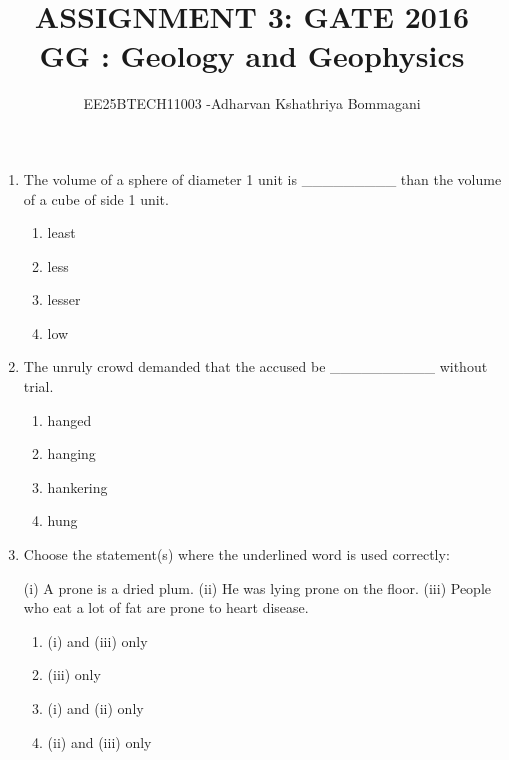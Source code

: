 \documentclass[journal,12pt,onecolumn]{IEEEtran}
\begin{document}
\title{
ASSIGNMENT 3: GATE 2016\\
GG : Geology and Geophysics}
\author{EE25BTECH11003 -Adharvan Kshathriya Bommagani}
\maketitle

\begin{enumerate}

\item The volume of a sphere of diameter 1 unit is \_\_\_\_\_\_\_\_\_ than the volume of a cube of side 1 unit.  

\hfill{}  

\begin{multicols}{4}
\begin{enumerate}
\item least
\item less
\item lesser
\item low
\end{enumerate}
\end{multicols}

\item The unruly crowd demanded that the accused be \_\_\_\_\_\_\_\_\_\_ without trial.  

\hfill{}  

\begin{multicols}{4}
\begin{enumerate}
\item hanged
\item hanging
\item hankering
\item hung
\end{enumerate}
\end{multicols}

\item Choose the statement(s) where the underlined word is used correctly:  

(i) A prone is a dried plum.  
(ii) He was lying prone on the floor.  
(iii) People who eat a lot of fat are prone to heart disease.  

\hfill{}  

\begin{multicols}{2}
\begin{enumerate}
\item (i) and (iii) only
\item (iii) only
\item (i) and (ii) only
\item (ii) and (iii) only
\end{enumerate}
\end{multicols}


\end{enumerate}
\end{document}
